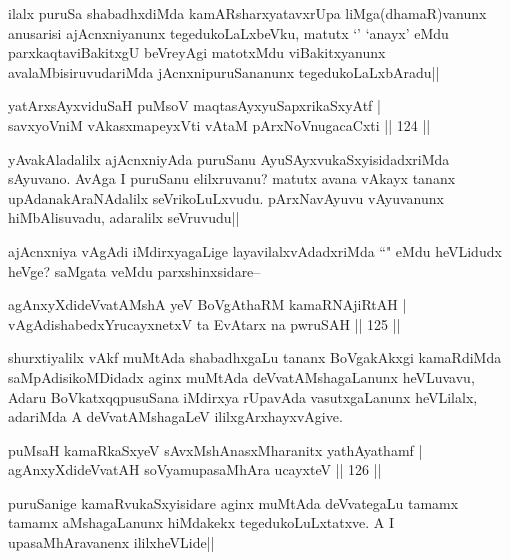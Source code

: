 \begin{artha}
ilalx puruSa shabadhxdiMda kamARsharxyatavxrUpa liMga(dhamaR)vanunx anusarisi ajAcnxniyanunx tegedukoLaLxbeVku, matutx `\stext' `anayx' eMdu parxkaqtaviBakitxgU beVreyAgi matotxMdu viBakitxyanunx avalaMbisiruvudariMda jAcnxnipuruSananunx tegedukoLaLxbAradu||
\end{artha}

\begin{shl}
yatArxsAyxviduSaH puMsoV maqtasAyx\s \s yuSapxrikaSxyAtf |\\
savxyoVniM vAkasxmapeyxVti vAtaM pArxNoV\s nugacaCxti \hfill || 124 ||
\end{shl}

\begin{artha}
yAvakAladalilx ajAcnxniyAda puruSanu AyuSAyxvukaSxyisidadxriMda sAyuvano. AvAga I puruSanu elilxruvanu? matutx avana vAkayx tananx upAdanakAraNAdalilx seVrikoLuLxvudu. pArxNavAyuvu vAyuvanunx hiMbAlisuvadu, adaralilx seVruvudu||
\end{artha}

\begin{artha}
ajAcnxniya vAgAdi iMdirxyagaLige layavilalxvAdadxriMda ``\stext" eMdu heVLidudx heVge? saMgata veMdu parxshinxsidare--
\end{artha}

\begin{shl}
agAnxyXdideVvatAMshA yeV BoVgAthaRM kamaRNA\s jiRtAH |\\
vAgAdishabedxYrucayxnetxV ta EvAtarx na pwruSAH \hfill || 125 ||
\end{shl}

\begin{artha}
shurxtiyalilx vAkf muMtAda shabadhxgaLu tananx BoVgakAkxgi kamaRdiMda saMpAdisikoMDidadx aginx muMtAda deVvatAMshagaLanunx heVLuvavu, Adaru BoVkatxqqpusuSana iMdirxya rUpavAda vasutxgaLanunx heVLilalx, adariMda A deVvatAMshagaLeV ililxgArxhayxvAgive.
\end{artha}

\begin{shl}
puMsaH kamaRkaSxyeV sAvxMshAnasxMharanitx yathAyathamf |\\
agAnxyXdideVvatAH soV\s yamupasaMhAra ucayxteV \hfill || 126 ||
\end{shl}

\begin{artha}
puruSanige kamaRvukaSxyisidare aginx muMtAda deVvategaLu tamamx tamamx aMshagaLanunx hiMdakekx tegedukoLuLxtatxve. A I upasaMhAravanenx ililxheVLide||
\end{artha}

